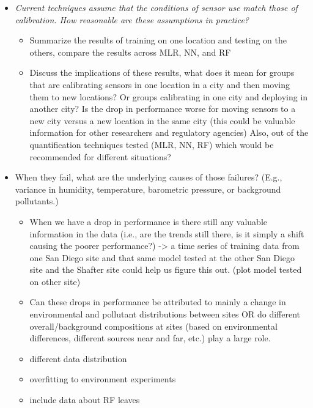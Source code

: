 \documentclass[journal abbreviation, manuscript]{copernicus}
\begin{document}
\begin{itemize}
    \item  \emph{Current techniques assume that the conditions of sensor use match those of calibration.  How reasonable are these assumptions in practice?}
    \begin{itemize}
        \item Summarize the results of training on one location and testing on the others, compare the results across MLR, NN, and RF 
        \item Discuss the implications of these results, what does it mean for groups that are calibrating sensors in one location in a city and then moving them to new locations? Or groups calibrating in one city and deploying in another city? Is the drop in performance worse for moving sensors to a new city versus a new location in the same city (this could be valuable information for other researchers and regulatory agencies) Also, out of the quantification techniques tested (MLR, NN, RF) which would be recommended for different situations?
    \end{itemize}
    \item When they fail, what are the underlying causes of those failures?  (E.g., variance in humidity, temperature, barometric pressure, or background pollutants.)
    \begin{itemize}
        \item When we have a drop in performance is there still any valuable information in the data (i.e., are the trends still there, is it simply a shift causing the poorer performance?) -> a time series of training data from one San Diego site and that same model tested at the other San Diego site and the Shafter site could help us figure this out. (plot model tested on other site)
        \item Can these drops in performance be attributed to mainly a change in environmental and pollutant distributions between sites OR do different overall/background compositions at sites (based on environmental differences, different sources near and far, etc.) play a large role.
        \item different data distribution
        \item overfitting to environment experiments
        \item include data about RF leaves
    \end{itemize}
\end{itemize}
\fi
\end{document}
